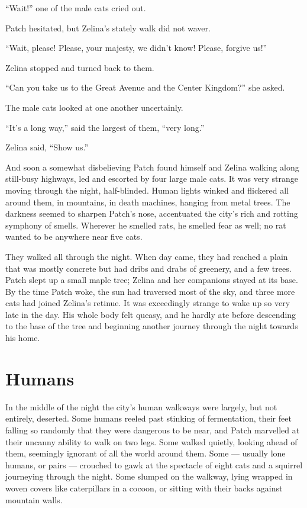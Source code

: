 \documentclass[ebook,oneside,openany,12pt]{memoir}
\begin{document}
“Wait!” one of the male cats cried out.

Patch hesitated, but Zelina’s stately walk did not waver.

“Wait, please! Please, your majesty, we didn’t know! Please, forgive
us!”

Zelina stopped and turned back to them.

“Can you take us to the Great Avenue and the Center Kingdom?” she
asked.

The male cats looked at one another uncertainly.

“It’s a long way,” said the largest of them, “very long.”

Zelina said, “Show us.”

And soon a somewhat disbelieving Patch found himself and Zelina
walking along still-busy highways, led and escorted by four large male
cats. It was very strange moving through the night,
half-blinded. Human lights winked and flickered all around them, in
mountains, in death machines, hanging from metal trees. The darkness
seemed to sharpen Patch’s nose, accentuated the city’s rich and
rotting symphony of smells. Wherever he smelled rats, he smelled fear
as well; no rat wanted to be anywhere near five cats.

They walked all through the night. When day came, they had reached a
plain that was mostly concrete but had dribs and drabs of greenery,
and a few trees. Patch slept up a small maple tree; Zelina and her
companions stayed at its base. By the time Patch woke, the sun had
traversed most of the sky, and three more cats had joined Zelina’s
retinue. It was exceedingly strange to wake up so very late in the
day. His whole body felt queasy, and he hardly ate before descending
to the base of the tree and beginning another journey through the
night towards his home.


\section{Humans}

In the middle of the night the city’s human walkways were largely, but
not entirely, deserted. Some humans reeled past stinking of
fermentation, their feet falling so randomly that they were dangerous
to be near, and Patch marvelled at their uncanny ability to walk on
two legs. Some walked quietly, looking ahead of them, seemingly
ignorant of all the world around them. Some — usually lone humans, or
pairs — crouched to gawk at the spectacle of eight cats and a squirrel
journeying through the night. Some slumped on the walkway, lying
wrapped in woven covers like caterpillars in a cocoon, or sitting with
their backs against mountain walls.
\end{document}
